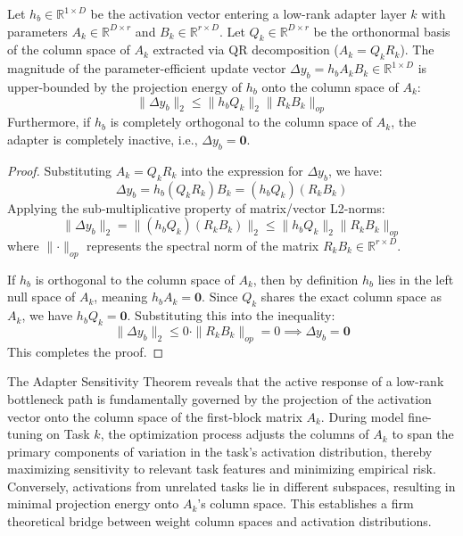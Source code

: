 \begin{theorem}
Let $h_b \in \mathbb{R}^{1 \times D}$ be the activation vector entering a low-rank adapter layer $k$ with parameters $A_k \in \mathbb{R}^{D \times r}$ and $B_k \in \mathbb{R}^{r \times D}$. Let $Q_k \in \mathbb{R}^{D \times r}$ be the orthonormal basis of the column space of $A_k$ extracted via QR decomposition ($A_k = Q_k R_k$). The magnitude of the parameter-efficient update vector $\Delta y_b = h_b A_k B_k \in \mathbb{R}^{1 \times D}$ is upper-bounded by the projection energy of $h_b$ onto the column space of $A_k$:
\begin{equation}
    \parallel \Delta y_b \parallel_2 \le \parallel h_b Q_k \parallel_2 \parallel R_k B_k \parallel_{op}
\end{equation}
Furthermore, if $h_b$ is completely orthogonal to the column space of $A_k$, the adapter is completely inactive, i.e., $\Delta y_b = \mathbf{0}$.
\end{theorem}

\begin{proof}
Substituting $A_k = Q_k R_k$ into the expression for $\Delta y_b$, we have:
\begin{equation}
    \Delta y_b = h_b (Q_k R_k) B_k = (h_b Q_k) (R_k B_k)
\end{equation}
Applying the sub-multiplicative property of matrix/vector L2-norms:
\begin{equation}
    \parallel \Delta y_b \parallel_2 = \parallel (h_b Q_k) (R_k B_k) \parallel_2 \le \parallel h_b Q_k \parallel_2 \parallel R_k B_k \parallel_{op}
\end{equation}
where $\parallel \cdot \parallel_{op}$ represents the spectral norm of the matrix $R_k B_k \in \mathbb{R}^{r \times D}$.

If $h_b$ is orthogonal to the column space of $A_k$, then by definition $h_b$ lies in the left null space of $A_k$, meaning $h_b A_k = \mathbf{0}$. Since $Q_k$ shares the exact column space as $A_k$, we have $h_b Q_k = \mathbf{0}$. Substituting this into the inequality:
\begin{equation}
    \parallel \Delta y_b \parallel_2 \le 0 \cdot \parallel R_k B_k \parallel_{op} = 0 \implies \Delta y_b = \mathbf{0}
\end{equation}
This completes the proof.
\end{proof}

The Adapter Sensitivity Theorem reveals that the active response of a low-rank bottleneck path is fundamentally governed by the projection of the activation vector onto the column space of the first-block matrix $A_k$. During model fine-tuning on Task $k$, the optimization process adjusts the columns of $A_k$ to span the primary components of variation in the task's activation distribution, thereby maximizing sensitivity to relevant task features and minimizing empirical risk. Conversely, activations from unrelated tasks lie in different subspaces, resulting in minimal projection energy onto $A_k$'s column space. This establishes a firm theoretical bridge between weight column spaces and activation distributions.

